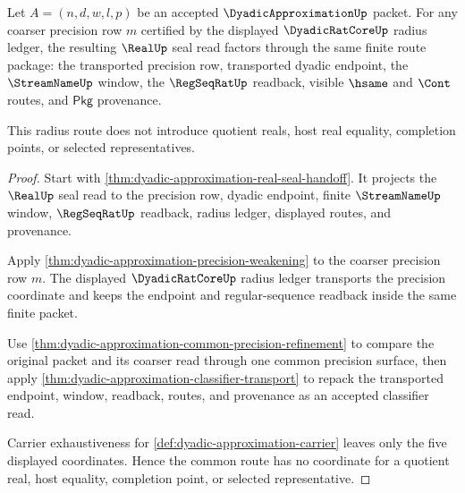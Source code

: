 \begin{theorem}
\label{thm:dyadicapproximation-real-seal-radius-route}
Let $A=(n,d,w,l,p)$ be an accepted $\DyadicApproximationUp$ packet. For any
coarser precision row $m$ certified by the displayed $\DyadicRatCoreUp$ radius
ledger, the resulting $\RealUp$ seal read factors through the same finite
route package: the transported precision row, transported dyadic endpoint, the
$\StreamNameUp$ window, the $\RegSeqRatUp$ readback, visible $\hsame$ and
$\Cont$ routes, and $\mathsf{Pkg}$ provenance.

This radius route does not introduce quotient reals, host real equality,
completion points, or selected representatives.
\end{theorem}
\begin{proof}
Start with \autoref{thm:dyadic-approximation-real-seal-handoff}. It projects
the $\RealUp$ seal read to the precision row, dyadic endpoint, finite
$\StreamNameUp$ window, $\RegSeqRatUp$ readback, radius ledger, displayed
routes, and provenance.

Apply \autoref{thm:dyadic-approximation-precision-weakening} to the coarser
precision row $m$. The displayed $\DyadicRatCoreUp$ radius ledger transports
the precision coordinate and keeps the endpoint and regular-sequence readback
inside the same finite packet.

Use \autoref{thm:dyadic-approximation-common-precision-refinement} to compare
the original packet and its coarser read through one common precision surface,
then apply \autoref{thm:dyadic-approximation-classifier-transport} to repack
the transported endpoint, window, readback, routes, and provenance as an
accepted classifier read.

Carrier exhaustiveness for \autoref{def:dyadic-approximation-carrier} leaves
only the five displayed coordinates. Hence the common route has no coordinate
for a quotient real, host equality, completion point, or selected
representative.
\end{proof}

